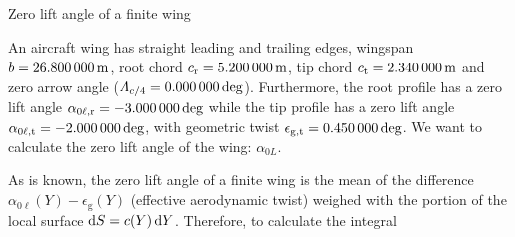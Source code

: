 \documentclass[[12pt,twoside]{book}
\begin{document}
%
\begin{myExampleX}{Zero lift angle of a finite wing}{}%
\label{example:Zero:Lift:Angle:Of:A:Finite:Wing}
%

%
An aircraft wing has straight leading and trailing edges, wingspan $b=\SI[round-precision=1]{\mySpanWingMT}{\metre}$,
root chord $c_\mathrm{r}=\SI[round-precision=2]{\myChordRootWingMT}{\metre}$,
tip chord $c_\mathrm{t}=\SI[round-precision=2]{\myChordTipWingMT}{\metre}$
and zero arrow angle ($\Lambda_{c/4}=\SI[round-precision=1]{\mySweepQuarterChordWingDEG}{\deg}$).
Furthermore, the root profile has a zero lift angle $\alpha_{0\ell,\mathrm{r}}=\SI[round-precision=1]{\myAlphaZeroLiftRootWingDEG}{\deg}$
while the tip profile has a zero lift angle
$\alpha_{0\ell,\mathrm{t}}=\SI[round-precision=1]{\myAlphaZeroLiftTipWingDEG}{\deg}$,
with geometric twist
$\epsilon_{\mathrm{g,t}}=\SI[round-precision=1]{\myTwistWingDEG}{\deg}$. We want to calculate the zero lift angle of the wing: $\alpha_{0L}$.

\medskip
As is known, the zero lift angle of a finite wing is the mean of the difference $\alpha_{0\ell}(Y)-\epsilon_\mathrm{g}(Y)$ (effective aerodynamic twist) weighed with the portion of the local surface $\diff{S}=c(Y)\diff{Y}$. Therefore, to calculate the integral


\end{myExampleX}
\end{document}
